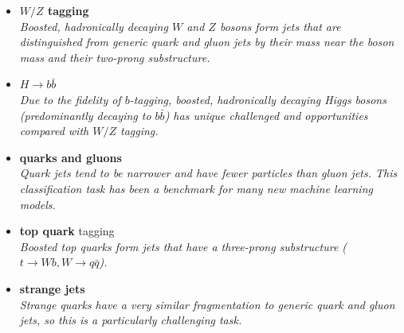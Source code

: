 \documentclass[12pt,letterpaper]{article}
\begin{document}
\begin{itemize}
\begin{itemize}
			\begin{itemize}
			\item \textbf{$W/Z$ tagging}~\cite{deOliveira:2015xxd,Barnard:2016qma,Louppe:2017ipp,Sirunyan:2020lcu,Chen:2019uar,1811770,Dreyer:2020brq,Kim:2021gtv,Subba:2022czw,Aguilar-Saavedra:2023pde,Athanasakos:2023fhq,Grossi:2023fqq,Baron:2023yhw,Bogatskiy:2023nnw}
			\\\textit{Boosted, hadronically decaying $W$ and $Z$ bosons form jets that are distinguished from generic quark and gluon jets by their mass near the boson mass and their two-prong substructure.}
			\item \textbf{$H\rightarrow b\bar{b}$}~\cite{Datta:2019ndh,Lin:2018cin,Moreno:2019neq,Chakraborty:2019imr,Sirunyan:2020lcu,Chung:2020ysf,Tannenwald:2020mhq,guo2020boosted,Abbas:2020khd,Jang:2021eph,Khosa:2021cyk}
			\\\textit{Due to the fidelity of $b$-tagging, boosted, hadronically decaying Higgs bosons (predominantly decaying to $b\bar{b}$) has unique challenged and opportunities compared with $W/Z$ tagging.}
			\item \textbf{quarks and gluons}~\cite{ATL-PHYS-PUB-2017-017,Komiske:2016rsd,Cheng:2017rdo,Stoye:DLPS2017,Chien:2018dfn,Moreno:2019bmu,Kasieczka:2018lwf,1806025,Lee:2019ssx,Lee:2019cad,Dreyer:2020brq,Romero:2021qlf,Filipek:2021qbe,Dreyer:2021hhr,Bright-Thonney:2022xkx,CrispimRomao:2023ssj,Athanasakos:2023fhq,He:2023cfc,Shen:2023ofd}
			\\\textit{Quark jets tend to be narrower and have fewer particles than gluon jets.  This classification task has been a benchmark for many new machine learning models.}
			\item \textbf{top quark} tagging~\cite{Almeida:2015jua,Stoye:DLPS2017,Kasieczka:2019dbj,Chakraborty:2020yfc,Diefenbacher:2019ezd,Butter:2017cot,Kasieczka:2017nvn,Macaluso:2018tck,Bhattacharya:2020vzu,Lim:2020igi,Dreyer:2020brq,Aguilar-Saavedra:2021rjk,Andrews:2021ejw,Dreyer:2022yom,Ahmed:2022hct,Munoz:2022gjq,Bhattacherjee:2022gjq,Choi:2023slq,Keicher:2023mer,He:2023cfc,Bogatskiy:2023nnw,Shen:2023ofd,Isildak:2023dnf,Sahu:2023uwb,Baron:2023yhw,Bogatskiy:2023fug}
			\\\textit{Boosted top quarks form jets that have a three-prong substructure ($t\rightarrow Wb,W\rightarrow q\bar{q}$).}
			\item \textbf{strange jets}~\cite{Nakai:2020kuu,Erdmann:2019blf,Erdmann:2020ovh,Subba:2023rpm}
			\\\textit{Strange quarks have a very similar fragmentation to generic quark and gluon jets, so this is a particularly challenging task.}

\end{itemize}
\end{itemize}
\end{itemize}
\end{document}
